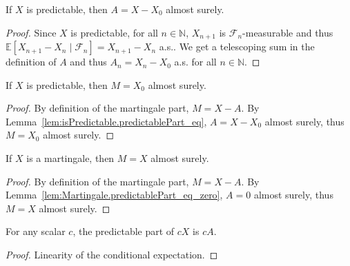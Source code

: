 \begin{lemma}\label{lem:isPredictable.predictablePart_eq}
  \leanok
If $X$ is predictable, then $A = X - X_0$ almost surely.
\end{lemma}

\begin{proof}\leanok
Since $X$ is predictable, for all $n \in \mathbb{N}$, $X_{n+1}$ is $\mathcal{F}_n$-measurable and thus $\mathbb{E}[X_{n+1} - X_n \mid \mathcal{F}_n] = X_{n+1} - X_n$ a.s..
We get a telescoping sum in the definition of $A$ and thus $A_n = X_n - X_0$ a.s. for all $n \in \mathbb{N}$.
\end{proof}


\begin{lemma}\label{lem:martingalePart_eq_zero}
  \leanok
If $X$ is predictable, then $M = X_0$ almost surely.
\end{lemma}

\begin{proof}\leanok
By definition of the martingale part, $M = X - A$. By Lemma~\ref{lem:isPredictable.predictablePart_eq}, $A = X - X_0$ almost surely, thus $M = X_0$ almost surely.
\end{proof}


\begin{lemma}\label{lem:Martingale.martingalePart_eq}
  \leanok
If $X$ is a martingale, then $M = X$ almost surely.
\end{lemma}

\begin{proof}\leanok
By definition of the martingale part, $M = X - A$. By Lemma~\ref{lem:Martingale.predictablePart_eq_zero}, $A = 0$ almost surely, thus $M = X$ almost surely.
\end{proof}


\begin{lemma}\label{lem:predictablePart_smul}
  \leanok
For any scalar $c$, the predictable part of $c X$ is $c A$.
\end{lemma}

\begin{proof}\leanok
Linearity of the conditional expectation.
\end{proof}


